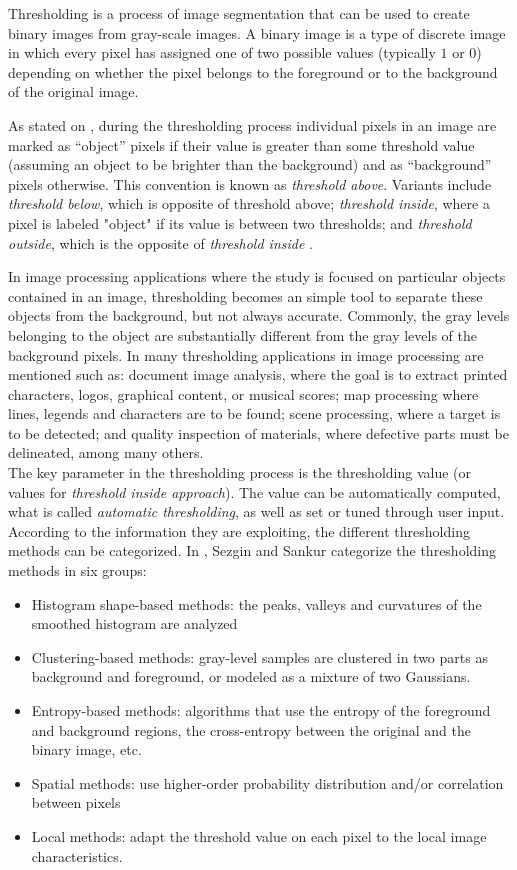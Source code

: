Thresholding is a process of image segmentation that can be used to create
binary images from gray-scale images. A binary image is a type of discrete image in
 which every pixel has assigned one of two possible values (typically 
$1$ or $0$) depending on whether the pixel belongs
to the foreground or to the background of the original image.

As stated on \cite{web:thresholding}, during the thresholding process individual 
pixels in an image are marked as ``object'' pixels if 
their value is greater than some threshold value (assuming an object to be brighter than the 
background) and as ``background'' pixels otherwise. This convention is known as \emph{threshold above}. 
Variants include \emph{threshold below}, which is opposite of threshold above; \emph{threshold inside}, where a 
pixel is labeled "object" if its value is between two thresholds; and \emph{threshold outside}, which is 
the opposite of \emph{threshold inside} \cite{shapiro}.

In image processing applications where the study is focused on particular objects contained
in an image, thresholding becomes an simple tool to separate these objects from
the background, but not always accurate. Commonly, the gray levels belonging to the object are substantially
different from the gray levels of the background pixels. In \cite[p.146]{thres} many thresholding
applications in image processing are mentioned such as: document image analysis, where the goal
is to extract printed characters, logos, graphical content, or musical scores; map processing
where lines, legends and characters are to be found; scene processing, where a target is to
be detected; and quality inspection of materials, where defective parts must be delineated,
among many others. \\

The key parameter in the thresholding process is the thresholding value (or values for
\emph{threshold inside approach}). The value can be automatically computed, what is called
\emph{automatic thresholding}, as well as set or tuned through user input.\\
According to the information they are exploiting, the different thresholding methods can be 
categorized. In \cite[p.147]{thres}, Sezgin and Sankur categorize the thresholding methods in
six groups:
\begin{itemize}
\item Histogram shape-based methods: the peaks, valleys and curvatures of the smoothed
histogram are analyzed
\item Clustering-based methods: gray-level samples are clustered in two parts as
background and foreground, or modeled as a mixture of two Gaussians.
\item Entropy-based methods: algorithms that use the entropy of the foreground 
and background regions, the cross-entropy between the original and the binary image, 
etc.
\item Spatial methods: use higher-order probability distribution and/or 
correlation between pixels
\item Local methods: adapt the threshold value on each pixel
to the local image characteristics.
\end{itemize}

